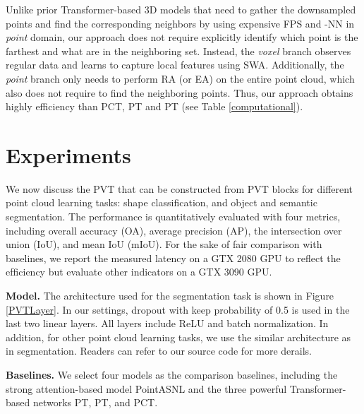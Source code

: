 \documentclass[10pt,twocolumn,letterpaper]{article}
\begin{document}
Unlike prior Transformer-based 3D models that need to gather the downsampled points and find the corresponding neighbors by using expensive FPS and -NN in \emph{point} domain, our approach does not require explicitly identify which point is the farthest and what are in the neighboring set. Instead, the \emph{voxel} branch observes regular data and learns to capture local features using SWA. Additionally, the \emph{point} branch only needs to perform RA (or EA) on the entire point cloud, which also does not require to find the neighboring points. Thus, our approach obtains highly efficiency than PCT, PT and PT (see Table \ref{computational}).


\section{Experiments}
We now discuss the PVT that can be constructed from PVT blocks for different point cloud learning tasks: shape classification, and object and semantic segmentation. The performance is quantitatively evaluated with four metrics, including overall accuracy (OA), average precision (AP), the intersection over union (IoU), and mean IoU (mIoU). For the sake of fair comparison with baselines, we report the measured latency on a GTX 2080 GPU to reﬂect the efﬁciency but evaluate other indicators on a GTX 3090 GPU.

\textbf{Model.}
The architecture used for the segmentation task is shown in Figure \ref{PVTLayer}. In our settings, dropout with keep probability of 0.5 is used in the last two linear layers. All layers include ReLU and batch normalization. In addition, for other point cloud learning tasks, we use the similar architecture as in segmentation. Readers can refer to our source code for more derails.

\textbf{Baselines.}
We select four models as the comparison baselines, including the strong attention-based model PointASNL and the three powerful Transformer-based networks PT, PT, and PCT.
\end{document}
